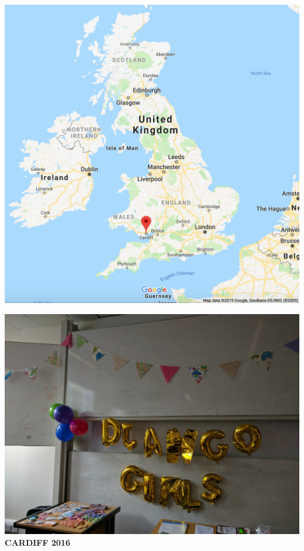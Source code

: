 \documentclass{beamer}
\begin{document}
\begin{frame}
    \begin{center}
    \includegraphics[width=.7\textwidth]{static/cardiff}
    \end{center}
\end{frame}

\begin{frame}
    \begin{center}
    \includegraphics[width=.7\textwidth]{static/first_django_girls.jpeg} \\
    \textbf{CARDIFF 2016}
    \end{center}
\end{frame}
\end{document}
